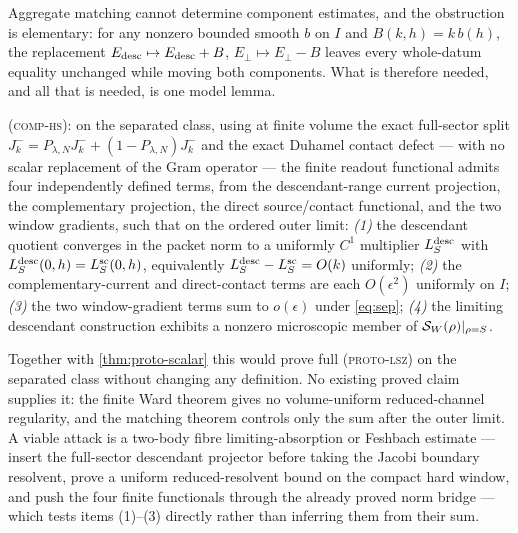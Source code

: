 \begin{scope}
\label{scope:comp-hs}
Aggregate matching cannot determine component estimates, and the obstruction
is elementary: for any nonzero bounded smooth $b$ on $I$ and
$B(k,h)=k\,b(h)$, the replacement
$E_{\rm desc}\mapsto E_{\rm desc}+B$, $E_\perp\mapsto E_\perp-B$ leaves every
whole-datum equality unchanged while moving both components. What is therefore
needed, and all that is needed, is one model lemma.

\textsc{(comp-hs)}: on the separated class, using at finite volume the exact
full-sector split $J^-_k=P_{\lambda,N}J^-_k+(1-P_{\lambda,N})J^-_k$ and the
exact Duhamel contact defect --- with no scalar replacement of the Gram
operator --- the finite readout functional admits four independently defined
terms, from the descendant-range current projection, the complementary
projection, the direct source/contact functional, and the two window
gradients, such that on the ordered outer limit: \emph{(1)} the descendant
quotient converges in the packet norm to a uniformly $C^1$ multiplier
$L_S^{\rm desc}$ with $L_S^{\rm desc}(0,h)=L_S^{\rm sc}(0,h)$, equivalently
$L_S^{\rm desc}-L_S^{\rm sc}=O(k)$ uniformly; \emph{(2)} the
complementary-current and direct-contact terms are each $O(\epsilon^2)$
uniformly on $I$; \emph{(3)} the two window-gradient terms sum to
$o(\epsilon)$ under \cref{eq:sep}; \emph{(4)} the limiting descendant
construction exhibits a nonzero microscopic member of
$\mathcal{S}_W(\rho)|_{\rho=S}$.

Together with \cref{thm:proto-scalar} this would prove full
\textsc{(proto-lsz)} on the separated class without changing any definition.
No existing proved claim supplies it: the finite Ward theorem gives no
volume-uniform reduced-channel regularity, and the matching theorem controls
only the sum after the outer limit. A viable attack is a two-body fibre
limiting-absorption or Feshbach estimate --- insert the full-sector descendant
projector before taking the Jacobi boundary resolvent, prove a uniform
reduced-resolvent bound on the compact hard window, and push the four finite
functionals through the already proved norm bridge --- which tests items (1)--(3)
directly rather than inferring them from their sum.
\end{scope}

